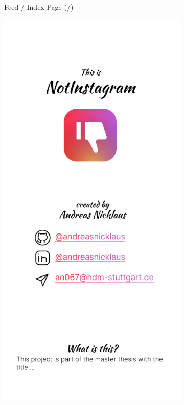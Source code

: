 \documentclass[a4paper, fontsize=11pt]{article}
\begin{document}
\begin{figure}[ht!]
\begin{subfigure}{0.49\linewidth}
\begin{center}
    \end{center}
    \caption{Feed / Index Page (/)}\label{subfig:index}
  \end{subfigure}
  \begin{subfigure}{0.49\linewidth}
    \begin{center}
      \includegraphics[width=\linewidth, height=0.3\textheight, keepaspectratio]{img/ig-clone/Informationsseite.png}

\end{center}
\end{subfigure}
\end{figure}
\end{document}

